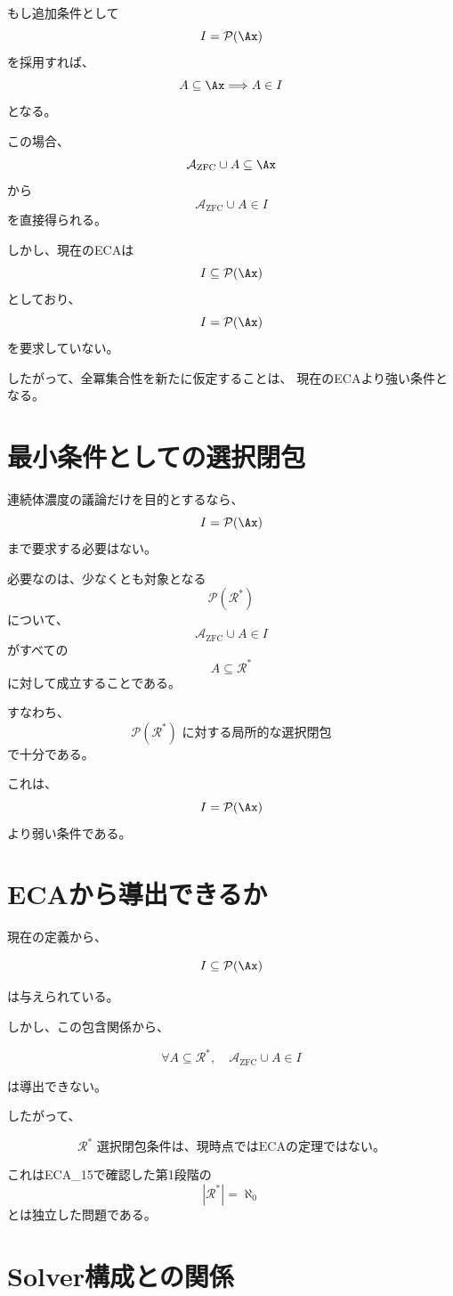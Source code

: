 \documentclass[11pt,a4paper]{article}
\begin{document}
もし追加条件として
\[
I=\mathcal{P}(\Ax)
\]
を採用すれば、
\[
A\subseteq\Ax
\Longrightarrow
A\in I
\]
となる。

この場合、
\[
\mathcal{A}_{\mathrm{ZFC}}\cup A
\subseteq\Ax
\]
から
\[
\mathcal{A}_{\mathrm{ZFC}}\cup A\in I
\]
を直接得られる。

しかし、現在のECAは
\[
I\subseteq\mathcal{P}(\Ax)
\]
としており、
\[
I=\mathcal{P}(\Ax)
\]
を要求していない。

したがって、全冪集合性を新たに仮定することは、
現在のECAより強い条件となる。

\section{最小条件としての選択閉包}

連続体濃度の議論だけを目的とするなら、
\[
I=\mathcal{P}(\Ax)
\]
まで要求する必要はない。

必要なのは、少なくとも対象となる
\[
\mathcal{P}(\mathcal{R}^*)
\]
について、
\[
\mathcal{A}_{\mathrm{ZFC}}\cup A\in I
\]
がすべての
\[
A\subseteq\mathcal{R}^*
\]
に対して成立することである。

すなわち、
\[
\boxed{
\mathcal{P}(\mathcal{R}^*)
\text{ に対する局所的な選択閉包}
}
\]
で十分である。

これは、
\[
I=\mathcal{P}(\Ax)
\]
より弱い条件である。

\section{ECAから導出できるか}

現在の定義から、

\[
I\subseteq\mathcal{P}(\Ax)
\]

は与えられている。

しかし、この包含関係から、

\[
\forall A\subseteq\mathcal{R}^*,
\quad
\mathcal{A}_{\mathrm{ZFC}}\cup A\in I
\]

は導出できない。

したがって、

\[
\boxed{
\text{$\mathcal{R}^*$ 選択閉包条件は、現時点ではECAの定理ではない。}
}
\]

これはECA\_15で確認した第1段階の
\[
|\mathcal{R}^*|=\aleph_0
\]
とは独立した問題である。

\section{Solver構成との関係}
\end{document}
